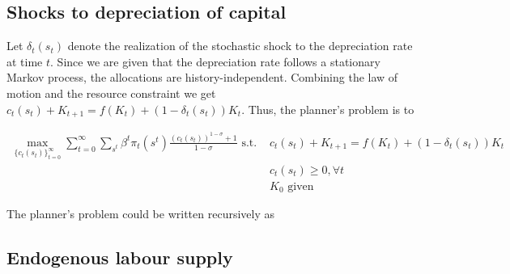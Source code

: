 \documentclass[]{article}
\begin{document}
\subsection{Shocks to depreciation of capital}

Let $\delta_t(s_t)$ denote the realization of the stochastic shock to the depreciation rate at time $t$. Since we are given that the depreciation rate follows a stationary Markov process, the allocations are history-independent. Combining the law of motion and the resource constraint we get $c_t(s_t) + K_{t+1} = f(K_t) + (1 - \delta_t(s_t))K_t$. Thus, the planner's problem is to

\begin{equation}
	\begin{split}
		\max\limits_{\{c_t(s_t)\}_{t = 0}^\infty}\sum\limits_{t = 0}^\infty\sum\limits_{s^t}\beta^t\pi_t(s^t)\frac{(c_t(s_t))^{1 - \sigma} + 1}{1 - \sigma}\text{ s.t. }&c_t(s_t) + K_{t + 1} = f(K_t) + (1 - \delta_t(s_t))K_t \nonumber \\
		&c_t(s_t)\geq 0, \forall t \\
		&K_0 \text{ given}
	\end{split}
\end{equation}

The planner's problem could be written recursively as



\subsection{Endogenous labour supply}
\end{document}

